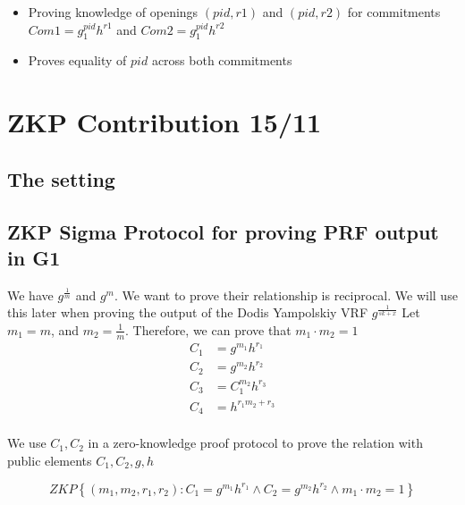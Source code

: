 \begin{itemize}
    \item Proving knowledge of openings $(pid, r1)$ and $(pid, r2)$ for commitments $Com1 = g_1^{pid}h^{r1}$ and $Com2 = g_1^{pid}h^{r2}$
    \item Proves equality of $pid$ across both commitments
\end{itemize}





\newpage
\section{ZKP Contribution 15/11}
\subsection{The setting}


\subsection{ZKP Sigma Protocol for proving PRF output in G1}
We have $g^{\frac{1}{m}}$ and $g^m$. We want to prove their relationship is reciprocal. We will use this later when proving the output of the Dodis Yampolskiy VRF $g^{\frac{1}{sk + x}}$
Let $m_1 = m$, and $m_2 = \frac{1}{m}$. Therefore, we can prove that $m_1 \cdot m_2 = 1$ 
\[ 
    \begin{aligned}
        C_1 &= g^{m_1}h^{r_1} \\
        C_2 &= g^{m_2}h^{r_2} \\
        C_3 &= C_1^{m_2}h^{r_3} \\ 
        C_4 &= h^{r_1m_2 + r_3} \\ 
    \end{aligned}
\]

We use $C_1, C_2$ in a zero-knowledge proof protocol to prove the relation with public elements $C_1, C_2, g, h$

\[
ZKP
    \left\{ 
    (m_1, m_2, r_1, r_2): C_1 = g^{m_1}h^{r_1} \wedge C_2 = g^{m_2}h^{r_2} \wedge m_1 \cdot m_2 = 1
    \right\}
\]

